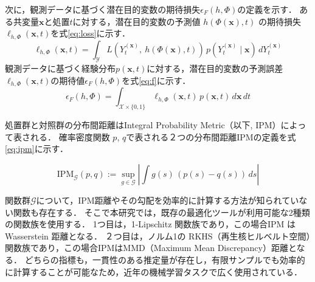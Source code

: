 \documentclass[dvipdfmx]{jreport}
\begin{document}
次に，観測データに基づく潜在目的変数の期待損失$\epsilon_F(h, \Phi)$の定義を示す．
ある共変量$\boldsymbol{x}$と処置$t$に対する，潜在目的変数の予測値 $h(\Phi(\boldsymbol{x}), t)$ の期待損失$\ell_{h,\Phi}(\boldsymbol{x}, t)$を式\eqref{eq:loss}に示す．
\begin{equation}
    \ell_{h,\Phi}(\boldsymbol{x}, t) = \int_{\mathcal{Y}} L(Y_t^{(\boldsymbol{x})},\ h(\Phi(\boldsymbol{x}), t)) \, p(Y_t^{(\boldsymbol{x})} \mid \boldsymbol{x}) \, dY_t^{(\boldsymbol{x})} \label{eq:loss}
\end{equation}
観測データに基づく経験分布$p(\boldsymbol{x},t)$に対する，潜在目的変数の予測誤差$\ell_{h,\Phi}(\boldsymbol{x}, t)$の期待値$\epsilon_F(h, \Phi)$を式\eqref{eq:f}に示す．
\begin{equation}
    \epsilon_F(h, \Phi) = \int_{\mathcal{X} \times \{0,1\}} \ell_{h, \Phi}(\boldsymbol{x}, t) \, p(\boldsymbol{x}, t) \, d\boldsymbol{x} \, dt \label{eq:f}
\end{equation}

処置群と対照群の分布間距離はIntegral Probability Metric（以下, IPM）によって表される．
確率密度関数 $p$, $q$で表される２つの分布間距離IPMの定義を式\eqref{eq:ipm}に示す．

\begin{equation}
    \mathrm{IPM}_{\mathcal{G}}(p, q) := \sup_{g \in \mathcal{G}} \left| \int g(s)\, (p(s) - q(s))\, ds \right| \label{eq:ipm}
\end{equation}

関数群$\mathcal{G}$について，IPM距離やその勾配を効率的に計算する方法が知られていない関数も存在する．
そこで本研究では，既存の最適化ツールが利用可能な2種類の関数族を使用する．
1つ目は，1-Lipschitz 関数族であり，この場合IPM は Wasserstein 距離となる．
２つ目は，ノルム1の RKHS（再生核ヒルベルト空間）関数族であり，この場合IPMはMMD（Maximum Mean Discrepancy）距離となる．
どちらの指標も，一貫性のある推定量が存在し，有限サンプルでも効率的に計算することが可能なため，近年の機械学習タスクで広く使用されている．
\end{document}

